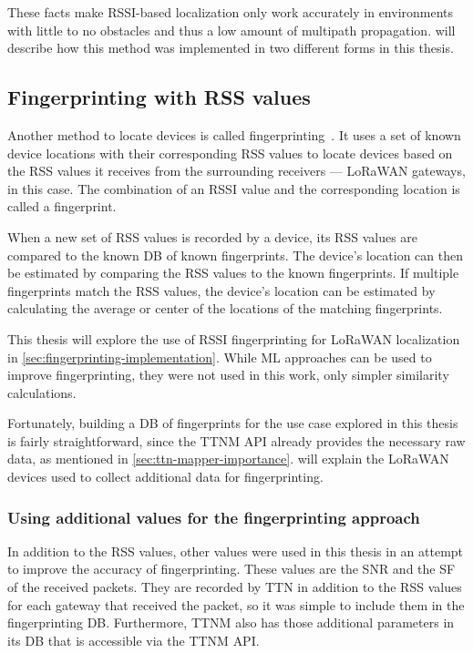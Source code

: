 These facts make \ac{RSSI}-based localization only work accurately in environments with little to no obstacles and thus a low amount of multipath propagation.
 will describe how this method was implemented in two different forms in this thesis.

\subsection{Fingerprinting with \acl{RSS} values}\label{sec:rssi-fingerprinting}

Another method to locate devices is called fingerprinting~\cite{xia_indoor_2017}.
It uses a set of known device locations with their corresponding \ac{RSS} values to locate devices based on the \ac{RSS} values it receives from the surrounding receivers --- \ac{LoRaWAN} gateways, in this case.
The combination of an \ac{RSSI} value and the corresponding location is called a fingerprint.

When a new set of \ac{RSS} values is recorded by a device, its \ac{RSS} values are compared to the known \ac{DB} of known fingerprints.
The device's location can then be estimated by comparing the \ac{RSS} values to the known fingerprints.
If multiple fingerprints match the \ac{RSS} values, the device's location can be estimated by calculating the average or center of the locations of the matching fingerprints.

This thesis will explore the use of \ac{RSSI} fingerprinting for \ac{LoRaWAN} localization in \cref{sec:fingerprinting-implementation}.
While \ac{ML} approaches can be used to improve fingerprinting, they were not used in this work, only simpler similarity calculations.

Fortunately, building a \ac{DB} of fingerprints for the use case explored in this thesis is fairly straightforward, since the \ac{TTNM} \ac{API} already provides the necessary raw data, as mentioned in \cref{sec:ttn-mapper-importance}.
 will explain the \ac{LoRaWAN} devices used to collect additional data for fingerprinting.

\subsubsection{Using additional values for the fingerprinting approach}\label{sec:fingerprinting-additional-values}

In addition to the \ac{RSS} values, other values were used in this thesis in an attempt to improve the accuracy of fingerprinting.
These values are the \ac{SNR} and the \ac{SF} of the received packets.
They are recorded by \ac{TTN} in addition to the \ac{RSS} values for each gateway that received the packet, so it was simple to include them in the fingerprinting \ac{DB}.
Furthermore, \ac{TTNM} also has those additional parameters in its \ac{DB} that is accessible via the \ac{TTNM} \ac{API}.